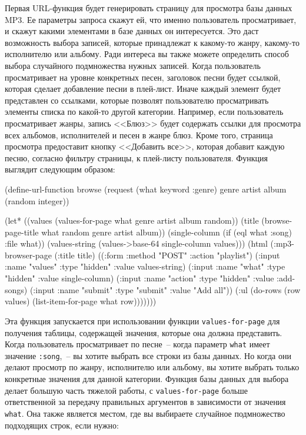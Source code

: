 Первая URL-функция будет генерировать страницу для просмотра базы данных MP3. Ее параметры
запроса скажут ей, что именно пользователь просматривает, и скажут какими элементами в
базе данных он интересуется. Это даст возможность выбора записей, которые принадлежат к
какому-то жанру, какому-то исполнителю или альбому. Ради интереса вы также можете
определить способ выбора случайного подмножества нужных записей. Когда пользователь
просматривает на уровне конкретных песен, заголовок песни будет ссылкой, которая сделает
добавление песни в плей-лист. Иначе каждый элемент будет представлен со ссылками, которые
позволят пользователю просматривать элементы списка по какой-то другой категории.
Например, если пользователь просматривает жанры, запись <<Блюз>> будет содержать ссылки
для просмотра всех альбомов, исполнителей и песен в жанре блюз. Кроме того, страница
просмотра предоставит кнопку <<Добавить все>>, которая добавит каждую песню, согласно
фильтру страницы, к плей-листу пользователя. Функция выглядит следующим образом:

\begin{myverb}
(define-url-function browse
    (request (what keyword :genre) genre artist album (random integer))

  (let* ((values (values-for-page what genre artist album random))
         (title (browse-page-title what random genre artist album))
         (single-column (if (eql what :song) :file what))
         (values-string (values->base-64 single-column values)))
    (html
     (:mp3-browser-page
      (:title title)
      ((:form :method "POST" :action "playlist")
       (:input :name "values" :type "hidden" :value values-string)
       (:input :name "what" :type "hidden" :value single-column)
       (:input :name "action" :type "hidden" :value :add-songs)
       (:input :name "submit" :type "submit" :value "Add all"))
      (:ul (do-rows (row values) (list-item-for-page what row)))))))
\end{myverb}

Эта функция запускается при использовании функции \lstinline{values-for-page} для получения
таблицы, содержащей значения, которые она должна представить. Когда пользователь
просматривает по песне~-- когда параметр \lstinline{what} имеет значение \lstinline{:song},~-- вы
хотите выбрать все строки из базы данных. Но когда они делают просмотр по жанру,
исполнителю или альбому, вы хотите выбрать только конкретные значения для данной
категории. Функция базы данных для выбора делает большую часть тяжелой работы, с
\lstinline{values-for-page} больше ответственной за передачу правильных аргументов в
зависимости от значения \lstinline{what}. Она также является местом, где вы выбираете случайное
подмножество подходящих строк, если нужно:

